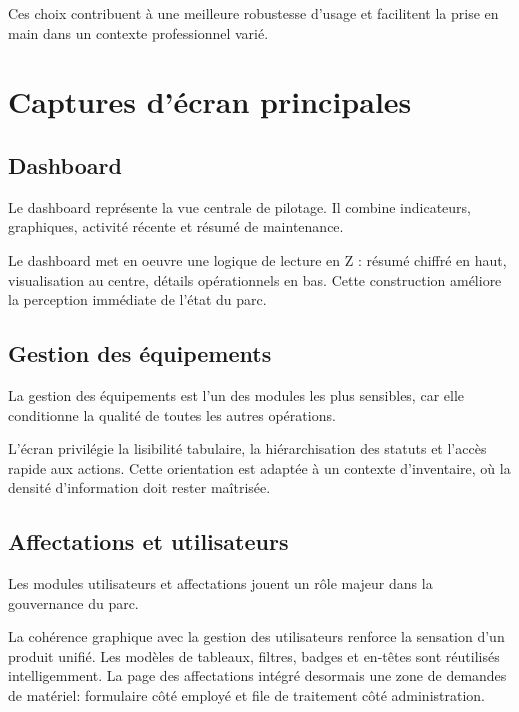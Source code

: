 Ces choix contribuent à une meilleure robustesse d'usage et facilitent la prise en main dans un contexte professionnel varié.

\section{Captures d'écran principales}
\subsection{Dashboard}
Le dashboard représente la vue centrale de pilotage. Il combine indicateurs, graphiques, activité récente et résumé de maintenance.


Le dashboard met en oeuvre une logique de lecture en Z : résumé chiffré en haut, visualisation au centre, détails opérationnels en bas. Cette construction améliore la perception immédiate de l'état du parc.

\subsection{Gestion des équipements}
La gestion des équipements est l'un des modules les plus sensibles, car elle conditionne la qualité de toutes les autres opérations.


L'écran privilégie la lisibilité tabulaire, la hiérarchisation des statuts et l'accès rapide aux actions. Cette orientation est adaptée à un contexte d'inventaire, où la densité d'information doit rester maîtrisée.

\subsection{Affectations et utilisateurs}
Les modules utilisateurs et affectations jouent un rôle majeur dans la gouvernance du parc.


La cohérence graphique avec la gestion des utilisateurs renforce la sensation d'un produit unifié. Les modèles de tableaux, filtres, badges et en-têtes sont réutilisés intelligemment. La page des affectations intégré desormais une zone de demandes de matériel: formulaire côté employé et file de traitement côté administration.

